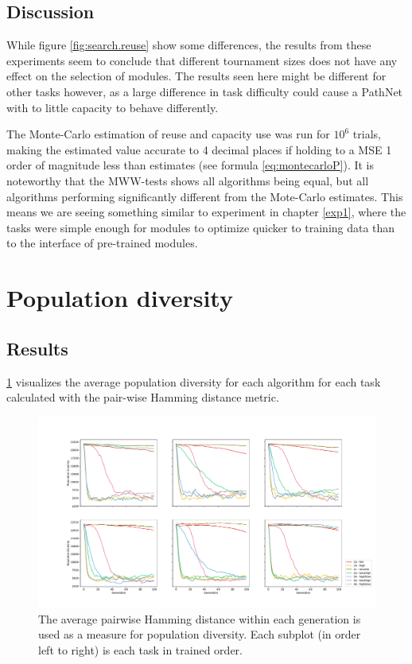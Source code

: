 \subsection{Discussion}
While figure \ref{fig:search.reuse} show some differences, the results from these experiments seem to conclude that different tournament sizes does not have any effect on the selection of modules. The results seen here might be different for other tasks however, as a large difference in task difficulty could cause a PathNet with to little capacity to behave differently.

The Monte-Carlo estimation of reuse and capacity use was run for \(10^{6}\) trials, making the estimated value accurate to 4 decimal places if holding to a MSE 1 order of magnitude less than estimates (see formula \ref{eq:montecarloP}). It is noteworthy that the MWW-tests shows all algorithms being equal, but all algorithms performing significantly different from the Mote-Carlo estimates. This means we are seeing something similar to experiment in chapter \ref{exp1}, where the tasks were simple enough for modules to optimize quicker to training data than to the interface of pre-trained modules.

\section{Population diversity}\label{exp2:diversity}
\subsection{Results}
\ref{fig:search.hamming_diversity} visualizes the average population diversity for each algorithm for each task calculated with the pair-wise Hamming distance metric. 

\begin{figure}
    \includegraphics[width=1.2\textwidth,center]{Chapters/4.Experiments/exp2/figures/large/Average_population_diversity_reduced_hamming.pdf}
    \caption[Pair-wise Hamming distance diversity]{The average pairwise Hamming distance within each generation is used as a measure for population diversity. Each subplot (in order left to right) is each task in trained order.}
    \label{fig:search.hamming_diversity}
\end{figure}

